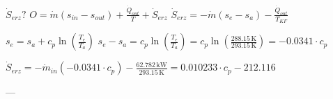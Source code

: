 \( \dot{S}_{erz}? \)  
\( O = \dot{m} (s_{in} - s_{out}) + \frac{\dot{Q}_{out}}{T} + \dot{S}_{erz} \)  
\( \dot{S}_{erz} = -\dot{m} (s_{e} - s_{a}) - \frac{\dot{Q}_{out}}{T_{KF}} \)  

\( s_{e} = s_{a} + c_{p} \ln \left( \frac{T_{e}}{T_{a}} \right) \)  
\( s_{e} - s_{a} = c_{p} \ln \left( \frac{T_{e}}{T_{a}} \right) = c_{p} \ln \left( \frac{288.15 \, \text{K}}{293.15 \, \text{K}} \right) = -0.0341 \cdot c_{p} \)  

\( \dot{S}_{erz} = -\dot{m}_{in} (-0.0341 \cdot c_{p}) - \frac{62.782 \, \text{kW}}{293.15 \, \text{K}} = 0.010233 \cdot c_{p} - 212.116 \)  

---